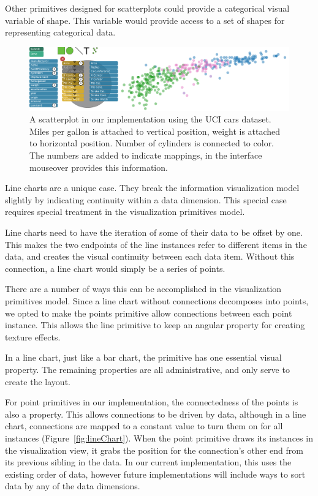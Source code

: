Other primitives designed for scatterplots could provide a categorical visual variable of shape.
This variable would provide access to a set of shapes for representing categorical data.

\begin{figure}[t]
\centering
\includegraphics[width=\textwidth]{images/scatterplot.pdf}
\caption{A scatterplot in our implementation using the UCI cars dataset.
Miles per gallon is attached to vertical position, weight is attached to horizontal position.
Number of cylinders is connected to color.
The numbers are added to indicate mappings, in the interface mouseover provides this information.
}
\label{fig:scatterplot}
\end{figure}

\label{lineChart}

Line charts are a unique case.
They break the information visualization model slightly by indicating continuity within a data dimension.
This special case requires special treatment in the visualization primitives model.

Line charts need to have the iteration of some of their data to be offset by one.
This makes the two endpoints of the line instances refer to different items in the data, and creates the visual continuity between each data item.
Without this connection, a line chart would simply be a series of points.

There are a number of ways this can be accomplished in the visualization primitives model.
Since a line chart without connections decomposes into points, we opted to make the points primitive allow connections between each point instance.
This allows the line primitive to keep an angular property for creating texture effects.

In a line chart, just like a bar chart, the primitive has one essential visual property.
The remaining properties are all administrative, and only serve to create the layout.

For point primitives in our implementation, the connectedness of the points is also a property.
This allows connections to be driven by data, although in a line chart, connections are mapped to a constant value to turn them on for all instances (Figure~\ref{fig:lineChart}).
When the point primitive draws its instances in the visualization view, it grabs the position for the connection's other end from its previous sibling in the data.
In our current implementation, this uses the existing order of data, however future implementations will include ways to sort data by any of the data dimensions.

